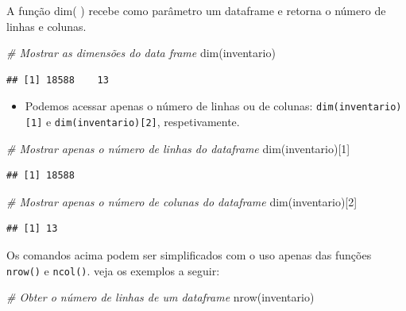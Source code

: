 \documentclass[
]{article}
\newenvironment{Shaded}{\begin{snugshade}}{\end{snugshade}}
\newcommand{\CommentTok}[1]{\textcolor[rgb]{0.56,0.35,0.01}{\textit{#1}}}
\newcommand{\DecValTok}[1]{\textcolor[rgb]{0.00,0.00,0.81}{#1}}
\newcommand{\FunctionTok}[1]{\textcolor[rgb]{0.00,0.00,0.00}{#1}}
\newcommand{\NormalTok}[1]{#1}
\providecommand{\tightlist}{%
  \setlength{\itemsep}{0pt}\setlength{\parskip}{0pt}}
\begin{document}
A função dim( ) recebe como parâmetro um dataframe e retorna o número de
linhas e colunas.

\begin{Shaded}
\begin{Highlighting}[]
\CommentTok{\# Mostrar as dimensões do data frame}
\FunctionTok{dim}\NormalTok{(inventario)}
\end{Highlighting}
\end{Shaded}

\begin{verbatim}
## [1] 18588    13
\end{verbatim}

\begin{itemize}
\tightlist
\item
  Podemos acessar apenas o número de linhas ou de colunas:
  \texttt{dim(inventario){[}1{]}} e \texttt{dim(inventario){[}2{]}},
  respetivamente.
\end{itemize}

\begin{Shaded}
\begin{Highlighting}[]
\CommentTok{\# Mostrar apenas o número de linhas do dataframe}
\FunctionTok{dim}\NormalTok{(inventario)[}\DecValTok{1}\NormalTok{]}
\end{Highlighting}
\end{Shaded}

\begin{verbatim}
## [1] 18588
\end{verbatim}

\begin{Shaded}
\begin{Highlighting}[]
\CommentTok{\# Mostrar apenas o número de colunas do dataframe}
\FunctionTok{dim}\NormalTok{(inventario)[}\DecValTok{2}\NormalTok{]}
\end{Highlighting}
\end{Shaded}

\begin{verbatim}
## [1] 13
\end{verbatim}

Os comandos acima podem ser simplificados com o uso apenas das funções
\texttt{nrow()} e \texttt{ncol()}. veja os exemplos a seguir:

\begin{Shaded}
\begin{Highlighting}[]
\CommentTok{\# Obter o número de linhas de um dataframe}
\FunctionTok{nrow}\NormalTok{(inventario)}
\end{Highlighting}
\end{Shaded}
\end{document}
